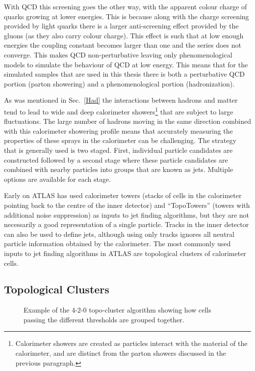 With QCD this screening goes the other way, with the apparent colour charge of quarks growing at lower energies.  
This is because along with the charge screening provided by light quarks there is a larger anti-screening effect provided by the gluons (as they also carry colour charge).  
This effect is such that at low enough energies the coupling constant becomes larger than one and the series does not converge.  
This makes QCD non-perturbative leaving only phenomenological models to simulate the behaviour of QCD at low energy.  
This means that for the simulated samples that are used in this thesis there is both a perturbative QCD portion (parton showering) and a phenomenological portion (hadronization).  

As was mentioned in Sec.~\ref{Had} the interactions between hadrons and matter tend to lead to wide and deep calorimeter showers\footnote{Calorimeter showers are created as particles interact with the material of the calorimeter, and are distinct from the parton showers discussed in the previous paragraph. } that are subject to large fluctuations.  
The large number of hadrons moving in the same direction combined with this calorimeter showering profile means that accurately measuring the properties of these sprays in the calorimeter can be challenging.  
The strategy that is generally used is two staged.  
First, individual particle candidates are constructed followed by a second stage where these particle candidates are combined with nearby particles into groups that are known as jets.  
Multiple options are available for each stage.  

Early on ATLAS has used calorimeter towers (stacks of cells in the calorimeter pointing back to the centre of the inner detector) and ``TopoTowers'' (towers with additional noise suppression) as inputs to jet finding algorithms, but they are not necessarily a good representation of a single particle.  
Tracks in the inner detector can also be used to define jets, although using only tracks ignores all neutral particle information obtained by the calorimeter.  
The most commonly used inputs to jet finding algorithms in ATLAS are topological clusters of calorimeter cells.  
 
\subsection{Topological Clusters}
\label{Sec:Topocluster}
\begin{figure}[!ht]
  \begin{center}
  \end{center}
  \caption[Topoclustering diagram]
  {\small Example of the 4-2-0 topo-cluster algorithm showing how cells passing the different thresholds are grouped together.  }
\end{figure}

